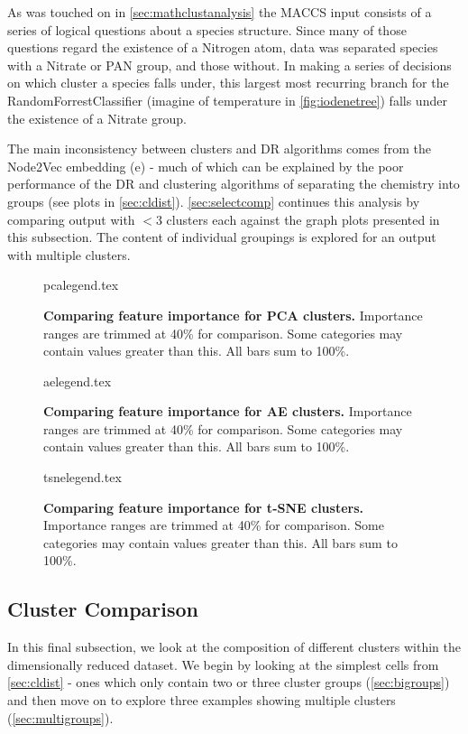  As was touched on in \autoref{sec:mathclustanalysis} the MACCS input consists of a series of logical questions about a species structure. Since many of those questions regard the existence of a Nitrogen atom, data was separated species with a Nitrate or PAN group, and those without. In making a series of decisions on which cluster a species falls under, this largest most recurring branch for the RandomForrestClassifier (imagine of temperature in \autoref{fig:iodenetree}) falls under the existence of a Nitrate group.

 The main inconsistency between clusters and DR algorithms comes from the Node2Vec embedding (e) - much of which can be explained by the poor performance of the DR and clustering algorithms of separating the chemistry into groups (see plots in \autoref{sec:cldist}). \autoref{sec:selectcomp} continues this analysis by comparing output with $<3$ clusters each against the graph plots presented in this subsection. The content of individual groupings is explored for an output with multiple clusters.


\begin{figure}[H]
    {pcalegend.tex}
    \caption{\textbf{Comparing feature importance for PCA clusters.} Importance ranges are trimmed at 40\% for comparison. Some categories may contain values greater than this. All bars sum to 100\%.}
    \label{fig:pcalegend}
\end{figure}
\begin{figure}[H]
    {aelegend.tex}
    \caption{\textbf{Comparing feature importance for AE clusters.} Importance ranges are trimmed at 40\% for comparison. Some categories may contain values greater than this. All bars sum to 100\%. }
    \label{fig:aelegend}
\end{figure}
\begin{figure}[H]
    {tsnelegend.tex}
    \caption{\textbf{Comparing feature importance for t-SNE clusters.} Importance ranges are trimmed at 40\% for comparison. Some categories may contain values greater than this. All bars sum to 100\%.}
    \label{fig:tsnelegend}
\end{figure}


\subsection{Cluster Comparison}\label{sec:selectcomp}

In this final subsection, we look at the composition of different clusters within the dimensionally reduced dataset. We begin by looking at the simplest cells from \autoref{sec:cldist} - ones which only contain two or three cluster groups (\autoref{sec:bigroups}) and then move on to explore three examples showing multiple clusters (\autoref{sec:multigroups}).



